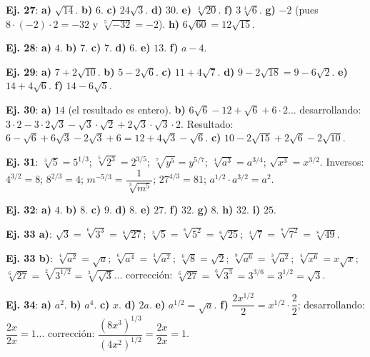 \documentclass[11pt, letterpaper]{article}
\begin{document}
\begin{tcolorbox}[answerbox, title={Bloque H — Multiplicación y productos notables}]

\noindent\textbf{Ej. 27}: \textbf{a)} $\sqrt{14}$. \textbf{b)} $6$. \textbf{c)} $24\sqrt{3}$. \textbf{d)} $30$. \textbf{e)} $\sqrt[3]{20}$. \textbf{f)} $3\sqrt[3]{6}$. \textbf{g)} $-2$ (pues $8\cdot(-2)\cdot2=-32$ y $\sqrt[5]{-32}=-2$). \textbf{h)} $6\sqrt{60}=12\sqrt{15}$.

\medskip

\noindent\textbf{Ej. 28}: \textbf{a)} $4$. \textbf{b)} $7$. \textbf{c)} $7$. \textbf{d)} $6$. \textbf{e)} $13$. \textbf{f)} $a-4$.

\medskip

\noindent\textbf{Ej. 29}: \textbf{a)} $7+2\sqrt{10}$. \textbf{b)} $5-2\sqrt{6}$. \textbf{c)} $11+4\sqrt{7}$. \textbf{d)} $9-2\sqrt{18}=9-6\sqrt{2}$. \textbf{e)} $14+4\sqrt{6}$. \textbf{f)} $14-6\sqrt{5}$.

\medskip

\noindent\textbf{Ej. 30}: \textbf{a)} $14$ (el resultado es entero). \textbf{b)} $6\sqrt{6}-12+\sqrt{6}+6\cdot2$... desarrollando: $3\cdot2-3\cdot 2\sqrt{3}-\sqrt{3}\cdot\sqrt{2}+2\sqrt{3}\cdot\sqrt{3}\cdot2$. Resultado: $6-\sqrt{6}+6\sqrt{3}-2\sqrt{3}+6=12+4\sqrt{3}-\sqrt{6}$. \textbf{c)} $10-2\sqrt{15}+2\sqrt{6}-2\sqrt{10}$.
\end{tcolorbox}

\clearpage

\begin{tcolorbox}[answerbox, title={Bloque I — Potencias racionales y cambio de índice}]

\noindent\textbf{Ej. 31}: $\sqrt[3]{5}=5^{1/3}$; $\sqrt[5]{2^3}=2^{3/5}$; $\sqrt[7]{y^5}=y^{5/7}$; $\sqrt[4]{a^3}=a^{3/4}$; $\sqrt{x^3}=x^{3/2}$. Inversos: $4^{3/2}=8$; $8^{2/3}=4$; $m^{-5/3}=\dfrac{1}{\sqrt[3]{m^5}}$; $27^{4/3}=81$; $a^{1/2}\cdot a^{3/2}=a^2$.

\medskip

\noindent\textbf{Ej. 32}: \textbf{a)} $4$. \textbf{b)} $8$. \textbf{c)} $9$. \textbf{d)} $8$. \textbf{e)} $27$. \textbf{f)} $32$. \textbf{g)} $8$. \textbf{h)} $32$. \textbf{i)} $25$.

\medskip

\noindent\textbf{Ej. 33 a)}: $\sqrt{3}=\sqrt[6]{3^3}=\sqrt[6]{27}$; $\sqrt[3]{5}=\sqrt[6]{5^2}=\sqrt[6]{25}$; $\sqrt[4]{7}=\sqrt[8]{7^2}=\sqrt[8]{49}$.

\noindent\textbf{Ej. 33 b)}: $\sqrt[4]{a^2}=\sqrt{a}$; $\sqrt[6]{a^4}=\sqrt[3]{a^2}$; $\sqrt[6]{8}=\sqrt{2}$; $\sqrt[9]{a^6}=\sqrt[3]{a^2}$; $\sqrt[4]{x^6}=x\sqrt{x}$; $\sqrt[6]{27}=\sqrt[2]{3^{1/2}}=\sqrt[2]{\sqrt{3}}$... corrección: $\sqrt[6]{27}=\sqrt[6]{3^3}=3^{3/6}=3^{1/2}=\sqrt{3}$.

\medskip

\noindent\textbf{Ej. 34}: \textbf{a)} $a^2$. \textbf{b)} $a^4$. \textbf{c)} $x$. \textbf{d)} $2a$. \textbf{e)} $a^{1/2}=\sqrt{a}$. \textbf{f)} $\dfrac{2x^{1/2}}{2}=x^{1/2}\cdot\dfrac{2}{2}$; desarrollando: $\dfrac{2x}{2x}=1$... corrección: $\dfrac{(8x^3)^{1/3}}{(4x^2)^{1/2}}=\dfrac{2x}{2x}=1$.
\end{tcolorbox}
\end{document}
